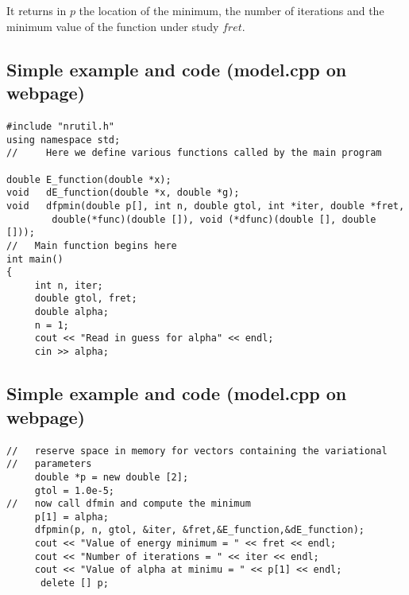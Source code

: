 \documentclass[%
twoside,                 %
final,                   %
10pt]{article}
\begin{document}
\noindent
It returns in $p$ the location of the minimum, the number of iterations and 
the minimum value of the function under study $fret$.




\subsection*{Simple example and code (model.cpp on webpage)}

\paragraph{}
\begin{verbatim}
#include "nrutil.h"
using namespace std;
//     Here we define various functions called by the main program

double E_function(double *x);
void   dE_function(double *x, double *g);
void   dfpmin(double p[], int n, double gtol, int *iter, double *fret,
	    double(*func)(double []), void (*dfunc)(double [], double []));
//   Main function begins here
int main()
{
     int n, iter;
     double gtol, fret;
     double alpha;
     n = 1;
     cout << "Read in guess for alpha" << endl;
     cin >> alpha;
\end{verbatim}



\subsection*{Simple example and code (model.cpp on webpage)}

\paragraph{}
\begin{verbatim}
//   reserve space in memory for vectors containing the variational
//   parameters
     double *p = new double [2];
     gtol = 1.0e-5;
//   now call dfmin and compute the minimum
     p[1] = alpha;
     dfpmin(p, n, gtol, &iter, &fret,&E_function,&dE_function);
     cout << "Value of energy minimum = " << fret << endl;
     cout << "Number of iterations = " << iter << endl;
     cout << "Value of alpha at minimu = " << p[1] << endl;
      delete [] p;
\end{verbatim}
\end{document}
